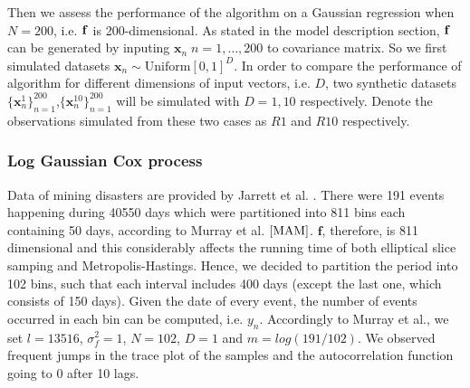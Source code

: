 \documentclass{article}
\begin{document}
Then we assess the performance of the algorithm on a Gaussian regression when $N=200$, i.e. $\bf{f}$ is 200-dimensional. As stated in the model description section, $\bf{f}$ can be generated by inputing $\mathbf{x}_n\;n=1,\dots,200$ to covariance matrix. So we first simulated datasets $\mathbf{x}_n\sim\text{Uniform}[0,1]^D$. In order to compare the performance of algorithm for different dimensions of input vectors, i.e. $D$, two synthetic datasets $\lbrace\mathbf{x}^1_n\rbrace_{n=1}^{200}$,$\lbrace\mathbf{x}^{10}_n\rbrace_{n=1}^{200}$ will be simulated with $D = 1,10$ respectively. Denote the observations simulated from these two cases as $R1$ and $R10$ respectively.

\subsubsection{Log Gaussian Cox process}

Data of mining disasters are provided by Jarrett et al. \cite{Jarrett}. There were 191 events happening during 40550 days which were partitioned into 811 bins each containing 50 days, according to Murray et al. $\cite{MAM}$. $\mathbf{f}$, therefore, is 811 dimensional and this considerably affects the running time of both elliptical slice samping and Metropolis-Hastings. Hence, we decided to partition the period into 102 bins, such that each interval includes 400 days (except the last one, which consists of 150 days). Given the date of every event, the number of events occurred in each bin can be computed, i.e. $y_n$. Accordingly to Murray et al., we set $l=13516$, $\sigma_f^2 = 1$, $N = 102$, $D=1$ and $m=log(191/102)$. We observed frequent jumps in the trace plot of the samples and the autocorrelation function going to 0 after 10 lags.
\end{document}
